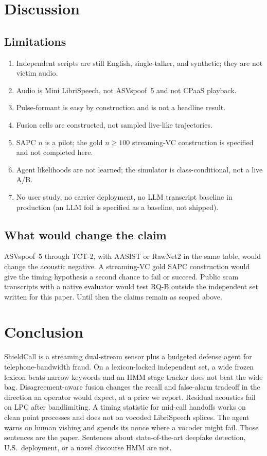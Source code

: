 \documentclass[11pt]{article}
\begin{document}
\section{Discussion}

\subsection{Limitations}
\begin{enumerate}
\item Independent scripts are still English, single-talker, and synthetic; they are not victim audio.
\item Audio is Mini LibriSpeech, not ASVspoof~5 and not CPaaS playback.
\item Pulse-formant is easy by construction and is not a headline result.
\item Fusion cells are constructed, not sampled live-like trajectories.
\item SAPC $n$ is a pilot; the gold $n{\ge}100$ streaming-VC construction is specified and not completed here.
\item Agent likelihoods are not learned; the simulator is class-conditional, not a live A/B.
\item No user study, no carrier deployment, no LLM transcript baseline in production (an LLM foil is specified as a baseline, not shipped).
\end{enumerate}

\subsection{What would change the claim}
ASVspoof~5 through TCT-2, with AASIST or RawNet2 in the same table, would change the acoustic negative. A streaming-VC gold SAPC construction would give the timing hypothesis a second chance to fail or succeed. Public scam transcripts with a native evaluator would test RQ-B outside the independent set written for this paper. Until then the claims remain as scoped above.

\section{Conclusion}

ShieldCall is a streaming dual-stream sensor plus a budgeted defense agent for telephone-bandwidth fraud. On a lexicon-locked independent set, a wide frozen lexicon beats narrow keywords and an HMM stage tracker does not beat the wide bag. Disagreement-aware fusion changes the recall and false-alarm tradeoff in the direction an operator would expect, at a price we report. Residual acoustics fail on LPC after bandlimiting. A timing statistic for mid-call handoffs works on clean point processes and does not on vocoded LibriSpeech splices. The agent warns on human vishing and spends its nonce where a vocoder might fail. Those sentences are the paper. Sentences about state-of-the-art deepfake detection, U.S.\ deployment, or a novel discourse HMM are not.
\end{document}
